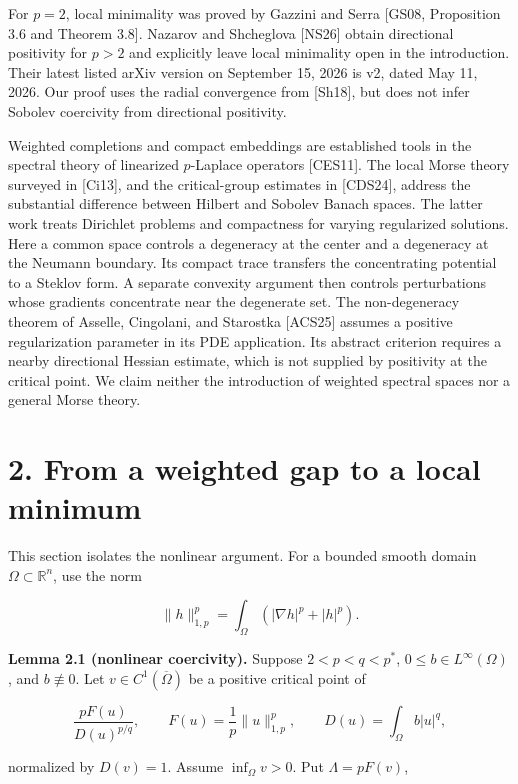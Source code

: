 \documentclass[11pt]{article}
\begin{document}
For \(p=2\), local minimality was proved by Gazzini and Serra {[}GS08,
Proposition 3.6 and Theorem 3.8{]}. Nazarov and Shcheglova {[}NS26{]}
obtain directional positivity for \(p>2\) and explicitly leave local
minimality open in the introduction. Their latest listed arXiv version
on September 15, 2026 is v2, dated May 11, 2026. Our proof uses the
radial convergence from {[}Sh18{]}, but does not infer Sobolev
coercivity from directional positivity.

Weighted completions and compact embeddings are established tools in the
spectral theory of linearized \(p\)-Laplace operators {[}CES11{]}. The
local Morse theory surveyed in {[}Ci13{]}, and the critical-group
estimates in {[}CDS24{]}, address the substantial difference between
Hilbert and Sobolev Banach spaces. The latter work treats Dirichlet
problems and compactness for varying regularized solutions. Here a
common space controls a degeneracy at the center and a degeneracy at the
Neumann boundary. Its compact trace transfers the concentrating
potential to a Steklov form. A separate convexity argument then controls
perturbations whose gradients concentrate near the degenerate set. The
non-degeneracy theorem of Asselle, Cingolani, and Starostka {[}ACS25{]}
assumes a positive regularization parameter in its PDE application. Its
abstract criterion requires a nearby directional Hessian estimate, which
is not supplied by positivity at the critical point. We claim neither
the introduction of weighted spectral spaces nor a general Morse theory.

\section{2. From a weighted gap to a local
minimum}\label{from-a-weighted-gap-to-a-local-minimum}

This section isolates the nonlinear argument. For a bounded smooth
domain \(\Omega\subset\mathbb R^n\), use the norm

\[
\|h\|_{1,p}^p=\int_\Omega(|\nabla h|^p+|h|^p).
\]

\textbf{Lemma 2.1 (nonlinear coercivity).} Suppose \(2<p<q<p^*\),
\(0\le b\in L^\infty(\Omega)\), and \(b\not\equiv0\). Let
\(v\in C^1(\overline\Omega)\) be a positive critical point of

\[
\frac{pF(u)}{D(u)^{p/q}},\qquad
F(u)=\frac1p\|u\|_{1,p}^p,\qquad D(u)=\int_\Omega b|u|^q,
\]

normalized by \(D(v)=1\). Assume \(\inf_\Omega v>0\). Put
\(\Lambda=pF(v)\),
\end{document}
